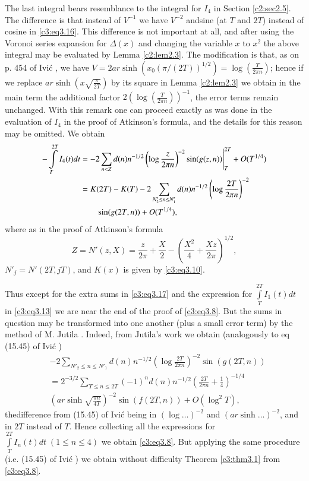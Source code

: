The last integral bears resemblance to the integral for $I_4$ in
Section \ref{c2:sec2.5}. The difference is that instead of $V^{-1}$ we have
$V^{-2}$ and\pageoriginale sine (at $T$ and $2T$) instead of cosine in
\eqref{c3:eq3.16}. This difference is not important at all, and after
using the Voronoi series expansion for $\Delta(x)$ and changing the
variable $x$ to $x^2$ the above integral may be evaluated by Lemma
\ref{c2:lem2.3}. The modification is that, as on p. 454 of Ivi\'c
\cite{Ivic1}, we have $V= 2 ar \sinh (x_0 (\pi /(2T))^{1/2})=
\log\left(\frac{T}{2 \pi n} \right)$; hence if we replace $ar \sinh
\left(x \sqrt{\frac{\pi}{2T}}\right)$ by its square in Lemma \ref{c2:lem2.3} we
obtain in the main term the additional factor $2 \left(\log
\left(\frac{T}{2 \pi n} \right) \right)^{-1}$, the error terms remain
unchanged. With this remark one can proceed exactly as was done in the
evaluation of $I_4$ in the proof of Atkinson's formula, and the
details for this reason may be omitted. We obtain 
\begin{align}
  - \int\limits_T^{2T} I_4 (t) dt & = - 2 \sum_{n < Z} d(n) n^{-1/2}
  \left(\log \frac{z}{2 \pi n} \right)^{-2} \sin (g(z, n))
  \Bigg|_T^{2T} + O(T^{1/4})\notag\\
  &= K(2T) - K(T) - 2 \sum_{N'_2 \leq n \leq N'_1} d(n) n^{-1/2}
  \left(\log \frac{2T}{2 \pi n} \right)^{-2}\notag\\ 
  & \qquad\sin (g (2 T, n)) +
  O(T^{1/4}),\label{c3:eq3.17} 
\end{align}
where as in the proof of Atkinson's formula
$$
Z= N' (z, X) = \frac{z}{2\pi} + \frac{X}{2} - \left(\frac{X^2}{4} +
\frac{Xz}{2 \pi} \right)^{1/2},
$$
$N'_j = N'(2T, jT)$, and $K(x)$ is given by \eqref{c3:eq3.10}.

Thus except for the extra sums in \eqref{c3:eq3.17} and the expression
for $\displaystyle{\int\limits_T^{2T} I_1 (t) dt}$ in
\eqref{c3:eq3.13} we are near the end of the proof of
\eqref{c3:eq3.8}. But the sums in question may be transformed into one
another (plus a small error term) by the method of M. Jutila
\cite{Jutila3}. Indeed, from Jutila's work we obtain (analogously to eq
(15.45) of Ivi\'c \cite{Ivic1})
\begin{align*}
 & -2 \sum_{N'_2 \leq n \leq N'_1} d(n) n^{-1/2} \left(\log \frac{2T}{2
    \pi n}\right)^{-2} \sin (g (2T, n))\\
  & = 2^{-3/2} \sum_{T \leq n \leq 2T} (-1)^n d(n) n^{-1/2}
  \left(\frac{2T}{2 \pi n} + \frac{1}{4} \right)^{-1/4}\\ 
  &\left(ar \sinh
  \sqrt{\frac{\pi n}{4T}}\right)^{-2} \sin (f (2T, n))+ O (\log^2 T),
\end{align*}
the\pageoriginale difference from (15.45) of Ivi\'c \cite{Ivic1} being in
$(\log \ldots )^{-2}$ and \break $(ar \sinh \ldots )^{-2}$, and in $2T$
instead of $T$. Hence collecting all the expressions for
$\int\limits_T^{2T} I_n (t) dt \; (1 \leq n \leq 4)$ we obtain
\eqref{c3:eq3.8}. But applying the same procedure (i.e. (15.45) of
Ivi\'c \cite{Ivic1}) we obtain without difficulty Theorem \ref{c3:thm3.1}
from \eqref{c3:eq3.8}.

